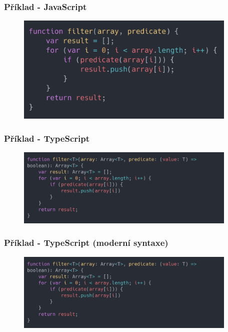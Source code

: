 \begin{frame}
    \frametitle{Příklad - JavaScript}
    \begin{figure}
        \includegraphics[width=300pt]{../resources/snippets/tsExample/example.js.png}
    \end{figure}
    
\end{frame}

\begin{frame}
    \frametitle{Příklad - TypeScript}
    \begin{figure}
        \includegraphics[width=300pt]{../resources/snippets/tsExample/example_rewritten.ts.png}
    \end{figure}
\end{frame}

\begin{frame}
    \frametitle{Příklad - TypeScript (moderní syntaxe)}
    \begin{figure}
        \includegraphics[width=300pt]{../resources/snippets/tsExample/example_rewritten.ts.png}
    \end{figure}
\end{frame}